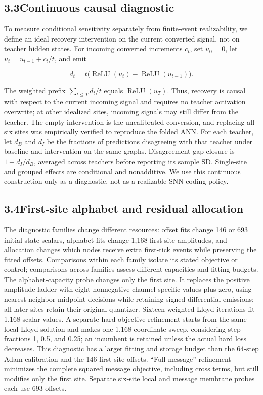 \documentclass[11pt]{article}
\begin{document}
\subsection*{3.3\quad Continuous causal diagnostic}

To measure conditional sensitivity separately from finite-event realizability, we define an ideal recovery intervention on the current converted signal, not on teacher hidden states. For incoming converted increments $c_t$, set $u_0=0$, let $u_t=u_{t-1}+c_t/t$, and emit

\[
d_t=t\bigl(\operatorname{ReLU}(u_t)-\operatorname{ReLU}(u_{t-1})\bigr).
\]

The weighted prefix $\sum_{t\leq T}d_t/t$ equals $\operatorname{ReLU}(u_T)$. Thus, recovery is causal with respect to the current incoming signal and requires no teacher activation overwrite; at other idealized sites, incoming signals may still differ from the teacher. The empty intervention is the uncalibrated conversion, and replacing all six sites was empirically verified to reproduce the folded ANN. For each teacher, let $d_B$ and $d_I$ be the fractions of predictions disagreeing with that teacher under baseline and intervention on the same graphs. Disagreement-gap closure is $1-d_I/d_B$, averaged across teachers before reporting its sample SD. Single-site and grouped effects are conditional and nonadditive. We use this continuous construction only as a diagnostic, not as a realizable SNN coding policy.

\subsection*{3.4\quad First-site alphabet and residual allocation}

The diagnostic families change different resources: offset fits change 146 or 693 initial-state scalars, alphabet fits change 1,168 first-site amplitudes, and allocation changes which nodes receive extra first-tick events while preserving the fitted offsets. Comparisons within each family isolate its stated objective or control; comparisons across families assess different capacities and fitting budgets. The alphabet-capacity probe changes only the first site. It replaces the positive amplitude ladder with eight nonnegative channel-specific values plus zero, using nearest-neighbor midpoint decisions while retaining signed differential emissions; all later sites retain their original quantizer. Sixteen weighted Lloyd iterations fit 1,168 scalar values. A separate hard-objective refinement starts from the same local-Lloyd solution and makes one 1,168-coordinate sweep, considering step fractions 1, 0.5, and 0.25; an incumbent is retained unless the actual hard loss decreases. This diagnostic has a larger fitting and storage budget than the 64-step Adam calibration and the 146 first-site offsets. ``Full-message'' refinement minimizes the complete squared message objective, including cross terms, but still modifies only the first site. Separate six-site local and message membrane probes each use 693 offsets.
\end{document}
